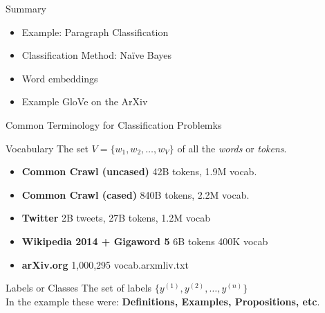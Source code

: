 \documentclass[9pt]{beamer}
\begin{document}
\begin{frame}{Summary}
    \begin{itemize}
            \item Example: Paragraph Classification
            \item Classification Method: Na\"ive Bayes
            \item Word embeddings
            \item Example GloVe on the ArXiv 
    \end{itemize}
\end{frame}
\begin{frame}{Common Terminology for Classification Problemks}
    \begin{exampleblock}{Vocabulary}
        The set $V = \{w_1,w_2,\ldots, w_V\}$ of all the \textit{words} or \textit{tokens}.
    \end{exampleblock}
        \begin{itemize}
            \item \textbf{Common Crawl (uncased)} 42B tokens, 1.9M vocab.
            \item \textbf{Common Crawl (cased)} 840B tokens, 2.2M vocab.
            \item \textbf{Twitter} 2B tweets, 27B tokens, 1.2M vocab
            \item \textbf{Wikipedia 2014 + Gigaword 5} 6B tokens 400K vocab
            \item \textbf{arXiv.org} 1,000,295 vocab.arxmliv.txt
        \end{itemize}

        \begin{exampleblock}{Labels or Classes}
            The set of labels $\{y^{(1)},y^{(2)},\ldots, y^{(n)}\}$\\
            In the example these were: \textbf{Definitions, Examples, Propositions, etc}.
        \end{exampleblock}


\end{frame}
\end{document}
